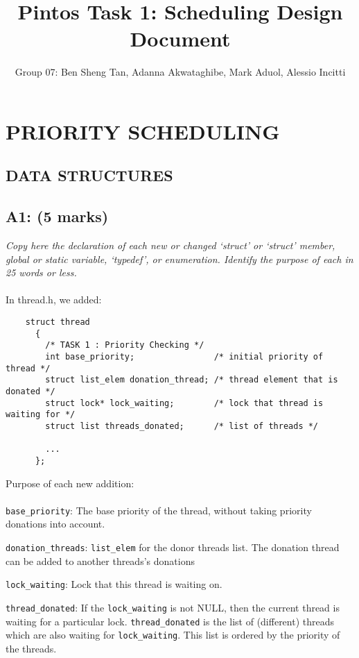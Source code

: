 \documentclass{article}
\title{Pintos Task 1: Scheduling Design Document}
\author{Group 07: Ben Sheng Tan, Adanna Akwataghibe, Mark Aduol, Alessio Incitti }
\begin{document}
\maketitle

\section{PRIORITY SCHEDULING}

\subsection{ DATA STRUCTURES}

\subsection*{A1: (5 marks) }

\textit{Copy here the declaration of each new or changed ‘struct’ or ‘struct’ member, global or static variable, ‘typedef’, or enumeration. Identify the purpose of each in 25 words or less.}
\\ \\
In thread.h, we added:
\begin{lstlisting}
    struct thread
      {
        /* TASK 1 : Priority Checking */
        int base_priority;                /* initial priority of thread */
        struct list_elem donation_thread; /* thread element that is donated */
        struct lock* lock_waiting;        /* lock that thread is waiting for */
        struct list threads_donated;      /* list of threads */

        ...
      };

\end{lstlisting}

Purpose of each new addition:
\\ \\
\texttt{base\_priority}: The base priority of the thread, without taking priority donations into account.

\texttt{donation\_threads}: \texttt{list\_elem} for the donor threads list. The donation thread can be added to another threads's donations

\texttt{lock\_waiting}: Lock that this thread is waiting on.

\texttt{thread\_donated}:  If the \texttt{lock\_waiting} is not NULL, then the current thread is
     waiting for a particular lock. \texttt{thread\_donated} is the list of
     (different) threads which are also waiting for \texttt{lock\_waiting}. This list is ordered by the priority of the threads.
\end{document}
